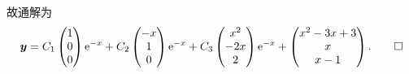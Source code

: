 \begin{solve}
  故通解为
  \[\bm{y} = C_1\begin{pmatrix}1\\0\\0\end{pmatrix}\mathrm{e}^{-x}
    + C_2\begin{pmatrix}-x\\1\\0\end{pmatrix}\mathrm{e}^{-x}
    + C_3\begin{pmatrix}x^2\\-2x\\2\end{pmatrix}\mathrm{e}^{-x}
    + \begin{pmatrix}x^2-3x+3\\x\\x-1\end{pmatrix}.\qedhere\]
\end{solve}



